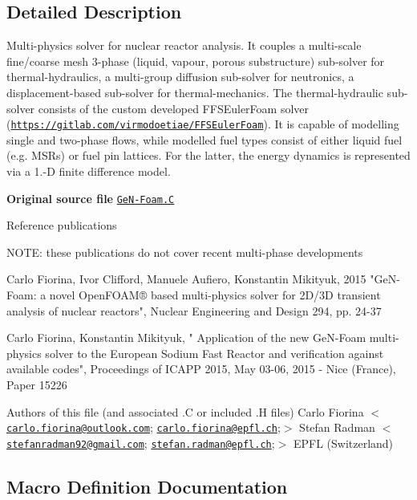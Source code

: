 \subsection{Detailed Description}
Multi-\/physics solver for nuclear reactor analysis. It couples a multi-\/scale fine/coarse mesh 3-\/phase (liquid, vapour, porous substructure) sub-\/solver for thermal-\/hydraulics, a multi-\/group diffusion sub-\/solver for neutronics, a displacement-\/based sub-\/solver for thermal-\/mechanics. The thermal-\/hydraulic sub-\/solver consists of the custom developed F\+F\+S\+Euler\+Foam solver (\href{https://gitlab.com/virmodoetiae/FFSEulerFoam}{\tt https\+://gitlab.\+com/virmodoetiae/\+F\+F\+S\+Euler\+Foam}). It is capable of modelling single and two-\/phase flows, while modelled fuel types consist of either liquid fuel (e.\+g. M\+S\+Rs) or fuel pin lattices. For the latter, the energy dynamics is represented via a 1.-\/D finite difference model. 

{\bfseries Original source file} \href{../../../home/carlo/data/GeN-Foam/GeN-Foam_ffn/GeN-Foam/GeN-Foam/main/GeN-Foam.C}{\tt Ge\+N-\/\+Foam.\+C}

\label{_Description}%
 Reference publications \begin{DoxyVerb}NOTE: these publications do not cover recent multi-phase developments

Carlo Fiorina, Ivor Clifford, Manuele Aufiero, Konstantin Mikityuk, 2015
"GeN-Foam: a novel OpenFOAM® based multi-physics solver for 2D/3D transient
analysis of nuclear reactors", Nuclear Engineering and Design 294, pp. 
24-37

Carlo Fiorina, Konstantin Mikityuk, " Application of the new GeN-Foam 
multi-physics solver to the European Sodium Fast Reactor and verification 
against available codes", Proceedings of ICAPP 2015, May 03-06, 2015 - 
Nice (France), Paper 15226
\end{DoxyVerb}


Authors of this file (and associated .C or included .H files) Carlo Fiorina $<$\href{mailto:carlo.fiorina@outlook.com}{\tt carlo.\+fiorina@outlook.\+com}; \href{mailto:carlo.fiorina@epfl.ch}{\tt carlo.\+fiorina@epfl.\+ch};$>$ Stefan Radman $<$\href{mailto:stefanradman92@gmail.com}{\tt stefanradman92@gmail.\+com}; \href{mailto:stefan.radman@epfl.ch}{\tt stefan.\+radman@epfl.\+ch};$>$ E\+P\+FL (Switzerland) 

\subsection{Macro Definition Documentation}
\mbox{\label{GeN-Foam_8C_a8ceea990ae1560f66059e9c4b230be5f}} 
